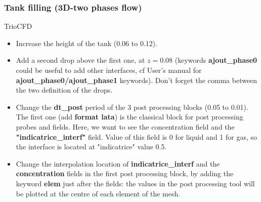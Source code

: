 \documentclass[10pt]{beamer}
\begin{document}
\begin{frame}
\frametitle{Tank filling (3D-two phases flow)}
\begin{block}{TrioCFD}

\begin{itemize}
\item Increase the height of the tank (0.06 to 0.12).

\item Add a second drop above the first one, at $z=0.08$ (keywords \textbf{ajout\_phase0} could be useful to add other interfaces, cf User's manual for \textbf{ajout\_phase0/ajout\_phase1} keywords). Don't forget the comma between the two definition of the drops.

\item Change the \textbf{dt\_post} period of the 3 post processing blocks (0.05 to 0.01). The first one (add \textbf{format lata}) is the classical block for post processing probes and fields. Here, we want to see the concentration field and the \textbf{"indicatrice\_interf"} field. Value of this field is 0 for liquid and 1 for gas, so the interface is located at "indicatrice" value 0.5.

\item Change the interpolation location of \textbf{indicatrice\_interf} and the \textbf{concentration} fields in the first post processing block, by adding the keyword \textbf{elem} just after the fields: the values in the post processing tool will be plotted at the centre of each element of the mesh.
\end{itemize}

\end{block}
\end{frame}
\end{document}

